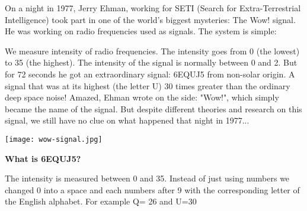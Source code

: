\begin{tcolorbox}[colback=red!5,colframe=DarkRed!40!black,title=\textbf{The wow! signal: Our first Extra-Terrestrial communication?}]

On a night in 1977, Jerry Ehman, working for SETI (Search for Extra-Terrestrial Intelligence) took part in one of the world's biggest mysteries: The Wow! signal. 
He was working on radio frequencies used as signals. The system is simple:

We measure intensity of radio frequencies. The intensity goes from 0 (the lowest) to 35 (the highest).  The intensity of the signal is normally between 0 and 2. But for 72 seconds he got an extraordinary signal: 6EQUJ5 from non-solar origin. A signal that was at its highest (the letter U) 30 times greater than the ordinary deep space noise! Amazed, Ehman wrote on the side: "Wow!", which simply became the name of the signal. But despite different theories and research on this signal, we still have no clue on what happened that night in 1977...\\

{\centering
\texttt{[image: wow-signal.jpg]}
\par}

\textbf{What is 6EQUJ5?}

The intensity is measured between 0 and 35. Instead of just using numbers we changed 0 into a space and each numbers after 9 with the corresponding letter of the English alphabet. For example Q= 26 and U=30
\end{tcolorbox}